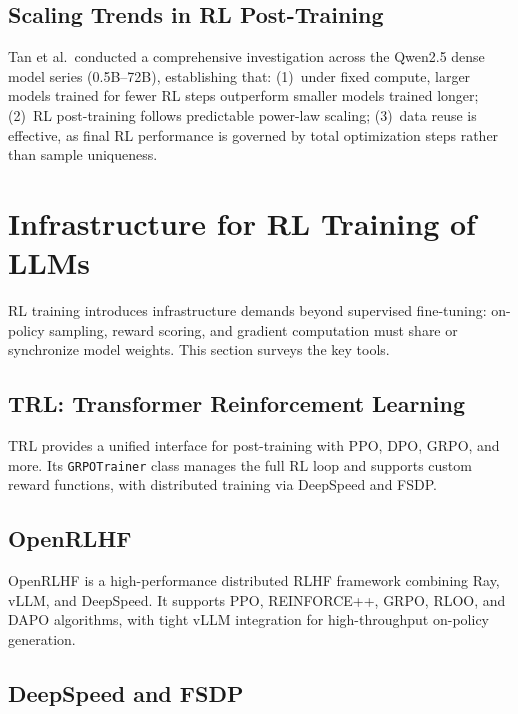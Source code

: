 \documentclass[12pt,a4paper]{report}
\theoremstyle{definition}
\begin{document}
\subsection{Scaling Trends in RL Post-Training}

Tan et al.\ conducted a comprehensive investigation across the Qwen2.5 dense model series (0.5B--72B), establishing that: (1)~under fixed compute, larger models trained for fewer RL steps outperform smaller models trained longer; (2)~RL post-training follows predictable power-law scaling; (3)~data reuse is effective, as final RL performance is governed by total optimization steps rather than sample uniqueness.


\section{Infrastructure for RL Training of LLMs}
\label{sec:infrastructure-rl-training}

RL training introduces infrastructure demands beyond supervised fine-tuning: on-policy sampling, reward scoring, and gradient computation must share or synchronize model weights. This section surveys the key tools.

\subsection{TRL: Transformer Reinforcement Learning}

TRL \cite{vonwerra2022trl} provides a unified interface for post-training with PPO, DPO, GRPO, and more. Its \texttt{GRPOTrainer} class manages the full RL loop and supports custom reward functions, with distributed training via DeepSpeed and FSDP.

\subsection{OpenRLHF}

OpenRLHF is a high-performance distributed RLHF framework combining Ray, vLLM, and DeepSpeed. It supports PPO, REINFORCE++, GRPO, RLOO, and DAPO algorithms, with tight vLLM integration for high-throughput on-policy generation.

\subsection{DeepSpeed and FSDP}
\end{document}
